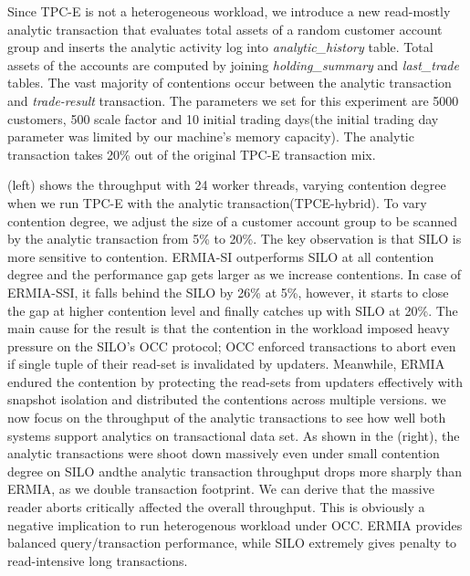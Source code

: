 Since TPC-E is not a heterogeneous workload, we introduce a new read-mostly analytic transaction that evaluates total assets of a random customer account group and inserts the analytic activity log into \textit{analytic\_history} table. Total assets of the accounts are computed by joining \textit{holding\_summary} and \textit{last\_trade} tables. The vast majority of contentions occur between the analytic transaction and \textit{trade-result} transaction.
The parameters we set for this experiment are 5000 customers, 500 scale factor and 10 initial trading days(the initial trading day parameter was limited by our machine's memory capacity).
The analytic transaction takes 20\% out of the original TPC-E transaction mix. %


(left) shows the throughput with 24 worker threads, varying contention degree when we run TPC-E with the analytic transaction(TPCE-hybrid). To vary contention degree, we adjust the size of a customer account group to be scanned by the analytic transaction from 5\% to 20\%. The key observation is that SILO is more sensitive to contention. ERMIA-SI outperforms SILO at all contention degree and the performance gap gets larger as we increase contentions. In case of ERMIA-SSI, it falls behind the SILO by 26\% at 5\%, however, it starts to close the gap at higher contention level and finally catches up with SILO at 20\%. 
The main cause for the result is that the contention in the workload imposed heavy pressure on the SILO's OCC protocol; OCC enforced transactions to abort even if single tuple of their read-set is invalidated by updaters. Meanwhile, ERMIA endured the contention by protecting the read-sets from updaters effectively with snapshot isolation and distributed the contentions across multiple versions. 
we now focus on the throughput of the analytic transactions to see how well both systems support analytics on transactional data set. As shown in the (right), the analytic transactions were shoot down massively even under small contention degree on SILO andthe analytic transaction throughput drops more sharply than ERMIA, as we double transaction footprint. We can derive that the massive reader aborts critically affected the overall throughput. This is obviously a negative implication to run heterogenous workload under OCC. ERMIA provides balanced query/transaction performance, while SILO extremely gives penalty to read-intensive long transactions. 

